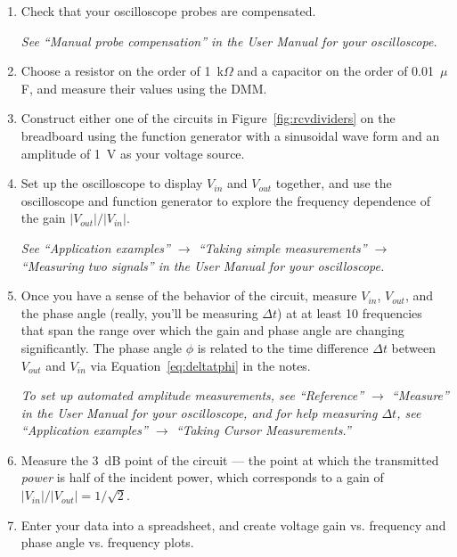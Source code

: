 \documentclass[11pt]{article}
\begin{document}
\begin{enumerate}
\item Check that your oscilloscope probes are compensated.

  \emph{See ``Manual probe compensation'' in the User Manual for
    your oscilloscope.}

\item Choose a resistor on the order of 1~k$\Omega$ and a capacitor on
  the order of 0.01~$\mu$F, and measure their values using the DMM.  

\item Construct either one of the circuits in
  Figure~\ref{fig:rcvdividers} on the breadboard using the function
  generator with a sinusoidal wave form and an amplitude of 1~V as
  your voltage source.

\item Set up the oscilloscope to display $V_{in}$ and $V_{out}$
  together, and use the oscilloscope and function generator to explore
  the frequency dependence of the gain $|V_{out}|/|V_{in}|$. 

  \emph{See ``Application examples'' $\rightarrow$ ``Taking simple
    measurements'' $\rightarrow$ ``Measuring two signals'' in the
    User Manual for your oscilloscope.}

\item Once you have a sense of the behavior of the circuit, measure
  $V_{in}$, $V_{out}$, and the phase angle (really, you'll be
  measuring $\Delta t$) at at least 10 frequencies that span the range
  over which the gain and phase angle are changing significantly.
  The phase angle $\phi$ is related to the time difference $\Delta t$
  between $V_{out}$ and $V_{in}$ via Equation~\ref{eq:deltatphi} in
  the notes. 

  \emph{To set up automated amplitude measurements, see ``Reference''
    $\rightarrow$ ``Measure'' in the User Manual for your
    oscilloscope, and for help measuring $\Delta t$, see ``Application
    examples'' $\rightarrow$ ``Taking Cursor Measurements.''}

\item Measure the 3~dB point of the circuit --- the point at
  which the transmitted \emph{power} is half of the
  incident power, which corresponds to a gain of $|V_{in}|/|V_{out}| =
  1/\sqrt{2}$.

\item Enter your data into a spreadsheet, and create voltage gain
  vs. frequency and phase angle vs. frequency plots.
\end{enumerate}
\end{document}
